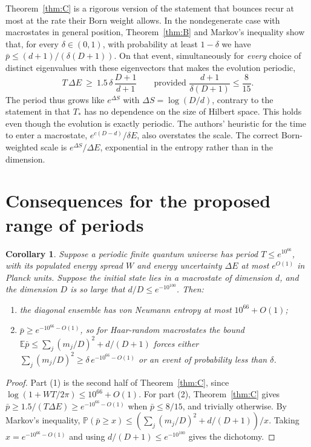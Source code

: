 \documentclass[11pt]{amsart}
\newtheorem{corollary}[theorem]{Corollary}
\theoremstyle{definition}
\newcommand{\EE}{\mathbb{E}}
\newcommand{\PP}{\mathbb{P}}
\begin{document}
Theorem~\ref{thm:C} is a rigorous version of the statement that bounces recur at most at the rate their Born weight allows. In the nondegenerate case with macrostates in general position, Theorem~\ref{thm:B} and Markov's inequality show that, for every $\delta\in(0,1)$, with probability at least $1-\delta$ we have $\bar p\le(d+1)/(\delta(D+1))$. On that event, simultaneously for \emph{every} choice of distinct eigenvalues with these eigenvectors that makes the evolution periodic,
\begin{equation}\label{eq:Tlower}
T\,\Delta E\ \ge\ 1.5\,\delta\,\frac{D+1}{d+1}\qquad\text{provided }\frac{d+1}{\delta(D+1)}\le\frac8{15}.
\end{equation}
The period thus grows like $e^{\Delta S}$ with $\Delta S=\log(D/d)$, contrary to the statement in \cite{CDD26} that $T_*$ has no dependence on the size of Hilbert space. This holds even though the evolution is exactly periodic. The authors' heuristic for the time to enter a macrostate, $e^{c(D-d)}/\delta E$, also overstates the scale. The correct Born-weighted scale is $e^{\Delta S}/\Delta E$, exponential in the entropy rather than in the dimension.

\section{Consequences for the proposed range of periods}\label{sec:window}

\begin{corollary}\label{cor:window}
Suppose a periodic finite quantum universe has period $T\le e^{10^{66}}$, with its populated energy spread $W$ and energy uncertainty $\Delta E$ at most $e^{O(1)}$ in Planck units. Suppose the initial state lies in a macrostate of dimension $d$, and the dimension $D$ is so large that $d/D\le e^{-10^{100}}$. Then:
\begin{enumerate}
\item the diagonal ensemble has von Neumann entropy at most $10^{66}+O(1)$;
\item $\bar p\ge e^{-10^{66}-O(1)}$, so for Haar-random macrostates the bound $\EE\bar p\le\sum_j(m_j/D)^2+d/(D+1)$ forces either $\sum_j(m_j/D)^2\ge\delta\,e^{-10^{66}-O(1)}$ or an event of probability less than $\delta$.
\end{enumerate}
\end{corollary}

\begin{proof}
Part (1) is the second half of Theorem~\ref{thm:C}, since $\log(1+WT/2\pi)\le10^{66}+O(1)$. For part (2), Theorem~\ref{thm:C} gives $\bar p\ge 1.5/(T\Delta E)\ge e^{-10^{66}-O(1)}$ when $\bar p\le8/15$, and trivially otherwise. By Markov's inequality, $\PP(\bar p\ge x)\le(\sum_j(m_j/D)^2+d/(D+1))/x$. Taking $x=e^{-10^{66}-O(1)}$ and using $d/(D+1)\le e^{-10^{100}}$ gives the dichotomy.
\end{proof}
\end{document}
